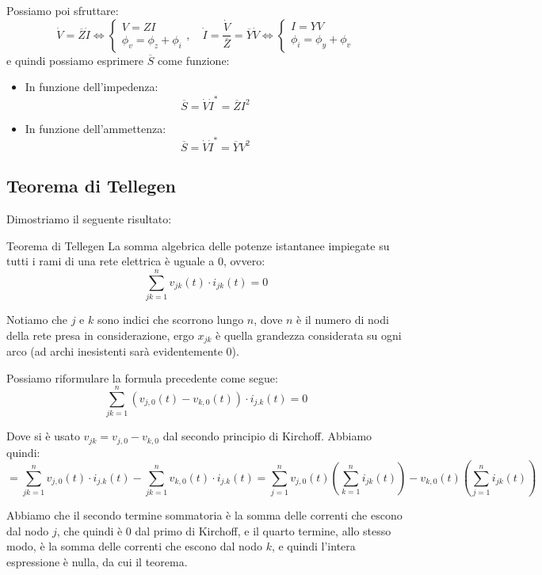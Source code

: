 \documentclass[a4paper,11pt]{article}
\begin{document}
Possiamo poi sfruttare: 
$$
\dot{V} = \overline{Z}\dot{I} \Leftrightarrow
	\begin{cases}
		V = ZI \\ 	
		\phi_v = \phi_z + \phi_i
	\end{cases}, \quad 
\dot{I} = \frac{\dot{V}}{\overline{Z}} = \overline{Y} \dot{V} \Leftrightarrow 
	\begin{cases}
		I = Y V \\ 
		\phi_i = \phi_y + \phi_v
	\end{cases}
$$
e quindi possiamo esprimere $\overline{S}$ come funzione:
\begin{itemize}
	\item In funzione dell'impedenza: 
$$
\overline{S} = \dot{V}\dot{I}^* = \overline{Z} I^2 
$$
	\item In funzione dell'ammettenza:
$$
\overline{S} = \dot{V}\dot{I}^* = \overline{Y} V^2
$$
\end{itemize}

\subsection{Teorema di Tellegen}
Dimostriamo il seguente risultato:
\begin{theorem}{Teorema di Tellegen}
	La somma algebrica delle potenze istantanee impiegate su tutti i rami di una rete elettrica è uguale a 0, ovvero:
$$
\sum_{jk = 1}^n v_{jk} (t) \cdot i_{jk}(t) = 0
$$
\end{theorem}

Notiamo che $j$ e $k$ sono indici che scorrono lungo $n$, dove $n$ è il numero di nodi della rete presa in considerazione, ergo $x_{jk}$ è quella grandezza considerata su ogni arco (ad archi inesistenti sarà evidentemente 0).

Possiamo riformulare la formula precedente come segue:
$$
\sum_{jk = 1}^n  \left( v_{j, 0}(t) - v_{k, 0}(t) \right) \cdot i_{j.k}(t) = 0
$$

Dove si è usato $v_{jk} = v_{j, 0} - v_{k, 0}$ dal secondo principio di Kirchoff.
Abbiamo quindi:
$$
= \sum_{jk = 1}^n  v_{j, 0}(t) \cdot i_{j.k}(t) - \sum_{jk = 1}^n v_{k, 0}(t) \cdot i_{j.k}(t) = \sum_{j=1}^n v_{j,0}(t) \left( \sum_{k=1}^n i_{jk}(t) \right) - v_{k,0}(t) \left( \sum_{j=1}^n i_{jk}(t) \right)
$$

Abbiamo che il secondo termine sommatoria è la somma delle correnti che escono dal nodo $j$, che quindi è 0 dal primo di Kirchoff, e il quarto termine, allo stesso modo, è la somma delle correnti che escono dal nodo $k$, e quindi l'intera espressione è nulla, da cui il teorema.
\end{document}
